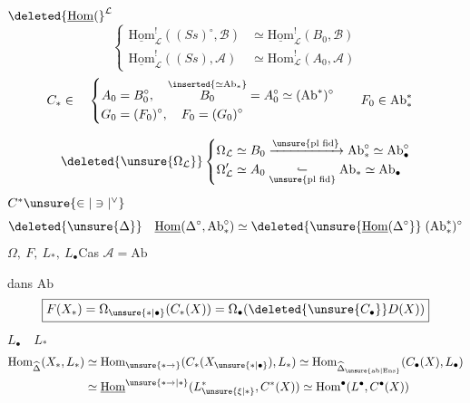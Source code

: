 \(\deleted{\underline{\mathrm{Hom}}(}^{\mathcal L}\)
\[
\left\{\begin{aligned}
\underline{\mathrm{Hom}}^{!}_{\mathcal L}((Ss)^\circ,\mathcal B)&\simeq\underline{\mathrm{Hom}}^{!}_{\mathcal L}(B_0,\mathcal B)\\
\underline{\mathrm{Hom}}^{!}_{\mathcal L}((Ss),\mathcal A)&\simeq\mathrm{Hom}^{!}_{\mathcal L}(A_0,\mathcal A)
\end{aligned}\right.
\]
\[
\begin{aligned}
C_* \in\quad
\left\{\begin{aligned}
A_0&=B_0^\circ,\quad \overset{\inserted{\simeq\mathrm{Ab}_*}}{B_0}=A_0^\circ\simeq(\mathrm{Ab}^*)^\circ\\
G_0&=(F_0)^\circ,\quad F_0=(G_0)^\circ
\end{aligned}\right.
&\qquad F_0\in\mathrm{Ab}^{*}_{*}
\end{aligned}
\]

\[
\deleted{\unsure{\Omega_{\mathcal L}}}\left\{\begin{aligned}
\Omega_{\mathcal L}&\simeq B_0 \xrightarrow{\unsure{\text{pl fid}}} \mathrm{Ab}_*^\circ \simeq\mathrm{Ab}_{\bullet}^{\circ}\\
\Omega'_{\mathcal L}&\simeq A_0 \mathrel{\underset{\unsure{\text{pl fid}}}{\lhook\joinrel\relbar}} \mathrm{Ab}_*\simeq\mathrm{Ab}_{\bullet}
\end{aligned}\right.
\]
\(C^*\unsure{\in|\ni|{}^\vee}\)
\[
\deleted{\unsure{\Delta}}\quad\underline{\mathrm{Hom}}(\Delta^\circ,\mathrm{Ab}_*^\circ)\simeq
\deleted{\unsure{\underline{\mathrm{Hom}}(\Delta^\circ}}\;(\mathrm{Ab}^{*}_{*})^\circ
\]
\(\Omega,\ F,\ L_*,\ L_{\bullet}\)\qquad Cas \(\mathcal A=\mathrm{Ab}\)

  dans \(\mathrm{Ab}\)
\[
\boxed{F(X_*)=\Omega_{\unsure{*|\bullet}}(C_*(X))=\Omega_{\bullet}(\deleted{\unsure{C_{\bullet}}}D(X))}
\]
\(L_\bullet\quad L_*\)
\[
\begin{aligned}
\mathrm{Hom}_{\widehat{\Delta}}(X_*,L_*)&\simeq\mathrm{Hom}_{\unsure{*{\to}}}(C_*(X_{\unsure{*|\bullet}}),L_*)\simeq\mathrm{Hom}_{\widehat{\Delta}_{\unsure{\rm ab|\mathrm{Ens}}}}(C_{\bullet}(X),L_{\bullet})\\
&\simeq\underline{\mathrm{Hom}}^{\unsure{*{\to}|*}}(L_{\unsure{\xi|*}}^*,C^*(X))\simeq\mathrm{Hom}^{\bullet}(L^{\bullet},C^{\bullet}(X))
\end{aligned}
\]

